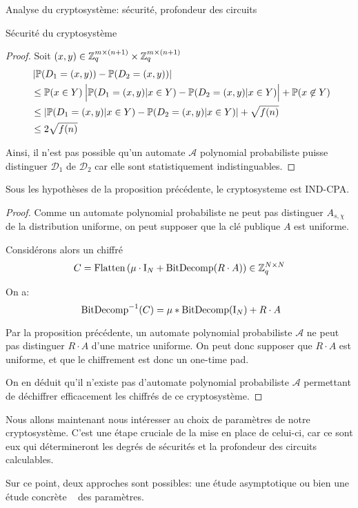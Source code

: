 \begin{section}{Analyse du cryptosystème: sécurité, profondeur des circuits}
\begin{subsection}{Sécurité du cryptosystème}
\begin{proof}
	
	Soit $(x,y)\in \mathbb{Z}_q^{m \times (n+1)} \times \mathbb{Z}_q^{m \times (n+1)}$
	\begin{align*}
	&\left|\PP(D_1 = (x,y)) - \PP(D_2 = (x,y))\right| \\ &\leq \PP(x\in Y)\:
	\Big|\PP(D_1 
	= (x,y)| x\in Y) - \PP(D_2 = (x,y)|x\in Y)\Big| + \PP(x \not\in Y)  \\
	&\leq |\PP(D_1 = (x,y) | x \in Y) - \PP(D_2 = (x,y)|x \in Y)| + \sqrt{f(n)} \\
	&\leq 2\sqrt{f(n)} 
	\end{align*}
	
	Ainsi, il n'est pas possible qu'un automate $\mathcal{A}$
	polynomial probabiliste puisse distinguer 
	$\mathcal{D}_1$ de $\mathcal{D}_2$ car elle sont statistiquement 
	indistinguables.
	\end{proof}
	\begin{thm}
	\label{ind_cpa}
	Sous les hypothèses de la proposition précédente, le
	cryptosysteme est IND-CPA.
	\end{thm}
	\begin{proof}
	Comme un automate polynomial probabiliste ne peut pas distinguer
	$A_{s, \chi}$ de la distribution uniforme, on peut supposer que la
	clé publique $A$ est uniforme.

	Considérons alors un chiffré 
	\[C = \text{Flatten}\left(\mu \cdot \text{I}_N + \text{BitDecomp}(R\cdot A)\right) \in
	\mathbb{Z}_q^{N\times N}\]

	On a:
	\[ \bitdecomp^{-1}(C) = \mu * \bitdecomp(\id_N) + R\cdot A\]

	Par la proposition précédente, un automate polynomial probabiliste $\mathcal{A}$
	ne peut pas distinguer $R\cdot A$ d'une matrice uniforme. On peut donc
	supposer que $R\cdot A$ est uniforme, et que le chiffrement est donc
	un one-time pad.

	On en déduit qu'il n'existe pas d'automate polynomial probabiliste
	$\mathcal{A}$ permettant de déchiffrer efficacement les chiffrés de ce cryptosystème.
	\end{proof}
	
	\end{subsection}

	Nous allons maintenant nous intéresser au choix de paramètres de notre
	cryptosystème. C'est une étape cruciale de la mise en place de celui-ci,
	car ce sont eux qui détermineront les degrés de sécurités et la profondeur des circuits calculables.
	
	Sur ce point, deux approches sont possibles: une étude asymptotique ou
	bien une étude \og concrète \fg~ des paramètres.


\end{section}
